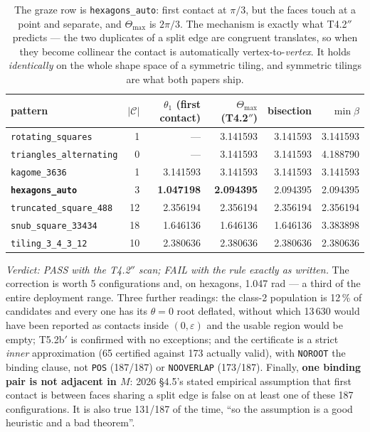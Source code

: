 \documentclass[10pt,a4paper]{article}
\newcommand{\fn}[1]{\nolinkurl{#1}}
\begin{document}
\begin{table}[h]\centering\small
\begin{tabular}{@{}lrrrrr@{}}
\toprule
pattern & $|\mathcal C|$ & $\theta_1$ (first contact) & $\Theta_{\max}$ (T4.2$''$) & bisection & $\min\beta$ \\
\midrule
\fn{rotating_squares}      & 1 & --- & 3.141593 & 3.141593 & 3.141593 \\
\fn{triangles_alternating} & 0 & --- & 3.141593 & 3.141593 & 4.188790 \\
\fn{kagome_3636}           & 1 & 3.141593 & 3.141593 & 3.141593 & 3.141593 \\
\textbf{\fn{hexagons_auto}} & 3 & \textbf{1.047198} & \textbf{2.094395} & 2.094395 & 2.094395 \\
\fn{truncated_square_488}  & 12 & 2.356194 & 2.356194 & 2.356194 & 2.356194 \\
\fn{snub_square_33434}     & 18 & 1.646136 & 1.646136 & 1.646136 & 3.383898 \\
\fn{tiling_3_4_3_12}       & 10 & 2.380636 & 2.380636 & 2.380636 & 2.380636 \\
\bottomrule
\end{tabular}
\caption{The graze row is \fn{hexagons_auto}: first contact at $\pi/3$, but the faces touch at a
point and separate, and $\Theta_{\max}$ is $2\pi/3$. The mechanism is exactly what T4.2$''$
predicts --- the two duplicates of a split edge are congruent translates, so when they become
collinear the contact is automatically vertex-to-\emph{vertex}. It holds \emph{identically} on
the whole shape space of a symmetric tiling, and symmetric tilings are what both papers ship.}
\end{table}

\emph{Verdict: PASS with the T4.2$''$ scan; FAIL with the rule exactly as written.}
The correction is worth 5 configurations and, on hexagons, 1.047 rad --- a third of the entire
deployment range. Three further readings: the class-2 population is 12\,\% of candidates and
every one has its $\theta=0$ root deflated, without which 13\,630 would have been reported as
contacts inside $(0,\varepsilon)$ and the usable region would be empty; T5.2b$'$ is confirmed
with no exceptions; and the certificate is a strict \emph{inner} approximation (65 certified
against 173 actually valid), with \texttt{NOROOT} the binding clause, not \texttt{POS}
(187/187) or \texttt{NOOVERLAP} (173/187).
Finally, \textbf{one binding pair is not adjacent in $M$}: 2026 \S4.5's stated empirical
assumption that first contact is between faces sharing a split edge is false on at least one of
these 187 configurations. It is also true 131/187 of the time, ``so the assumption is a good
heuristic and a bad theorem''.
\end{document}
